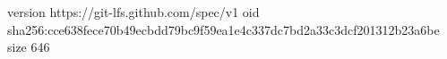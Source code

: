 version https://git-lfs.github.com/spec/v1
oid sha256:cce638fece70b49ecbdd79bc9f59ea1e4c337dc7bd2a33c3dcf201312b23a6be
size 646
